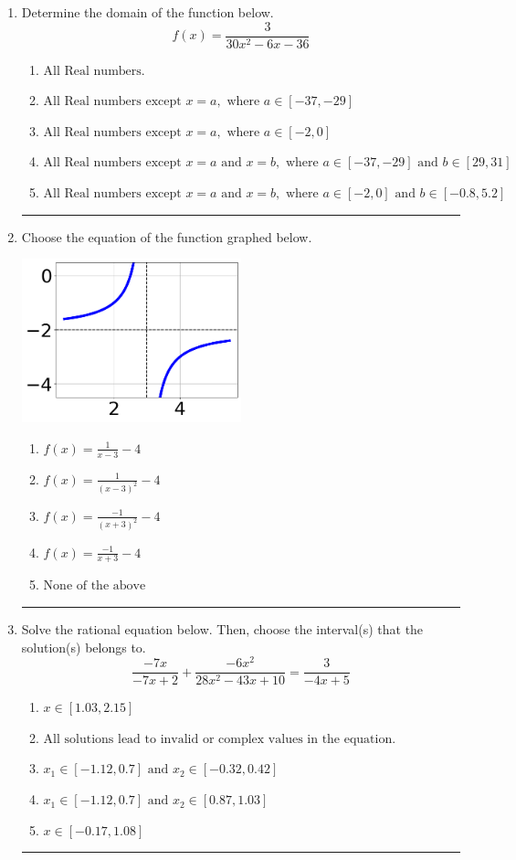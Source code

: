 \documentclass[14pt]{extbook}
\newcommand{\litem}[1]{\item#1\hspace*{-1cm}\rule{\textwidth}{0.4pt}}
\begin{document}
\begin{enumerate}
{\begin{enumerate}[label=\Alph*.]
\end{enumerate} }
\litem{
Determine the domain of the function below.\[ f(x) = \frac{3}{30x^{2} -6 x -36} \]\begin{enumerate}[label=\Alph*.]
\item \( \text{All Real numbers.} \)
\item \( \text{All Real numbers except } x = a, \text{ where } a \in [-37, -29] \)
\item \( \text{All Real numbers except } x = a, \text{ where } a \in [-2, 0] \)
\item \( \text{All Real numbers except } x = a \text{ and } x = b, \text{ where } a \in [-37, -29] \text{ and } b \in [29, 31] \)
\item \( \text{All Real numbers except } x = a \text{ and } x = b, \text{ where } a \in [-2, 0] \text{ and } b \in [-0.8, 5.2] \)

\end{enumerate} }
\litem{
Choose the equation of the function graphed below.
\begin{center}
    \includegraphics[width=0.5\textwidth]{../Figures/rationalGraphToEquationA.png}
\end{center}
\begin{enumerate}[label=\Alph*.]
\item \( f(x) = \frac{1}{x - 3} - 4 \)
\item \( f(x) = \frac{1}{(x - 3)^2} - 4 \)
\item \( f(x) = \frac{-1}{(x + 3)^2} - 4 \)
\item \( f(x) = \frac{-1}{x + 3} - 4 \)
\item \( \text{None of the above} \)

\end{enumerate} }
\litem{
Solve the rational equation below. Then, choose the interval(s) that the solution(s) belongs to.\[ \frac{-7x}{-7x + 2} + \frac{-6x^{2}}{28x^{2} -43 x + 10} = \frac{3}{-4x + 5} \]\begin{enumerate}[label=\Alph*.]
\item \( x \in [1.03,2.15] \)
\item \( \text{All solutions lead to invalid or complex values in the equation.} \)
\item \( x_1 \in [-1.12, 0.7] \text{ and } x_2 \in [-0.32,0.42] \)
\item \( x_1 \in [-1.12, 0.7] \text{ and } x_2 \in [0.87,1.03] \)
\item \( x \in [-0.17,1.08] \)


\end{enumerate}}
\end{enumerate}
\end{document}
